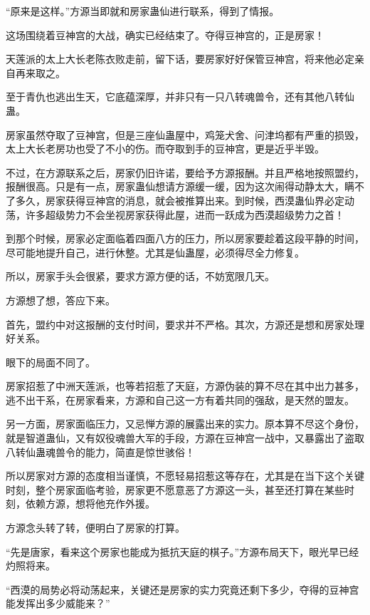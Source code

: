 
\begin{this_body}

“原来是这样。”方源当即就和房家蛊仙进行联系，得到了情报。

这场围绕着豆神宫的大战，确实已经结束了。夺得豆神宫的，正是房家！

天莲派的太上大长老陈衣败走前，留下话，要房家好好保管豆神宫，将来他必定亲自再来取之。

至于青仇也逃出生天，它底蕴深厚，并非只有一只八转魂兽令，还有其他八转仙蛊。

房家虽然夺取了豆神宫，但是三座仙蛊屋中，鸡笼犬舍、问津坞都有严重的损毁，太上大长老房功也受了不小的伤。而夺取到手的豆神宫，更是近乎半毁。

不过，在方源联系之后，房家仍旧许诺，要给予方源报酬。并且严格地按照盟约，报酬很高。只是有一点，房家蛊仙想请方源缓一缓，因为这次闹得动静太大，瞒不了多久，房家获得豆神宫的消息，就会被推算出来。到时候，西漠蛊仙界必定动荡，许多超级势力不会坐视房家获得此屋，进而一跃成为西漠超级势力之首！

到那个时候，房家必定面临着四面八方的压力，所以房家要趁着这段平静的时间，尽可能地提升自己，进行休整。尤其是仙蛊屋，必须得尽全力修复。

所以，房家手头会很紧，要求方源方便的话，不妨宽限几天。

方源想了想，答应下来。

首先，盟约中对这报酬的支付时间，要求并不严格。其次，方源还是想和房家处理好关系。

眼下的局面不同了。

房家招惹了中洲天莲派，也等若招惹了天庭，方源伪装的算不尽在其中出力甚多，逃不出干系，在房家看来，方源和自己这一方有着共同的强敌，是天然的盟友。

另一方面，房家面临压力，又忌惮方源的展露出来的实力。原本算不尽这个身份，就是智道蛊仙，又有奴役魂兽大军的手段，方源在豆神宫一战中，又暴露出了盗取八转仙蛊魂兽令的能力，简直是惊世骇俗！

所以房家对方源的态度相当谨慎，不愿轻易招惹这等存在，尤其是在当下这个关键时刻，整个房家面临考验，房家更不愿意恶了方源这一头，甚至还打算在某些时刻，依赖方源，想将他充作外援。

方源念头转了转，便明白了房家的打算。

“先是唐家，看来这个房家也能成为抵抗天庭的棋子。”方源布局天下，眼光早已经灼照将来。

“西漠的局势必将动荡起来，关键还是房家的实力究竟还剩下多少，夺得的豆神宫能发挥出多少威能来？”


\end{this_body}
